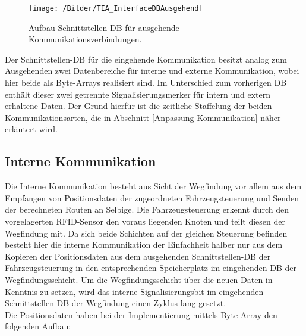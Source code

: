 		\begin{figure}[h]
			\centering
			\texttt{[image: /Bilder/TIA\_InterfaceDBAusgehend]}
			\vspace{0.2cm}
			\caption{Aufbau Schnittstellen-\ac{DB} für ausgehende Kommunikationsverbindungen.}\label{InterfaceDB}
		\end{figure}

		Der Schnittstellen-DB für die eingehende Kommunikation besitzt analog zum Ausgehenden zwei Datenbereiche für interne und externe Kommunikation, wobei hier beide als Byte-Arrays realisiert sind. Im Unterschied zum vorherigen \ac{DB} enthält dieser zwei getrennte Signalisierungsmerker für intern und extern erhaltene Daten. Der Grund hierfür ist die zeitliche Staffelung der beiden Kommunikationsarten, die in Abschnitt \ref{Anpassung Kommunikation} näher erläutert wird.
		
	\subsection{Interne Kommunikation}
		\label{Interne Kommunikation}
		Die Interne Kommunikation besteht aus Sicht der Wegfindung vor allem aus dem Empfangen von Positionsdaten der zugeordneten Fahrzeugsteuerung und Senden der berechneten Routen an Selbige. Die Fahrzeugsteuerung erkennt durch den vorgelagerten \ac{RFID}-Sensor den voraus liegenden Knoten und teilt diesen der Wegfindung mit. Da sich beide Schichten auf der gleichen Steuerung befinden besteht hier die interne Kommunikation der Einfachheit halber nur aus dem Kopieren der Positionsdaten aus dem ausgehenden Schnittstellen-\ac{DB} der Fahrzeugsteuerung in den entsprechenden Speicherplatz im eingehenden \ac{DB} der Wegfindungsschicht. Um die Wegfindungsschicht über die neuen Daten in Kenntnis zu setzen, wird das interne Signalisierungsbit im eingehenden Schnittstellen-\ac{DB} der Wegfindung einen Zyklus lang gesetzt.
		\\[4pt]
		Die Positionsdaten haben bei der Implementierung mittels Byte-Array den folgenden Aufbau:\\
		
